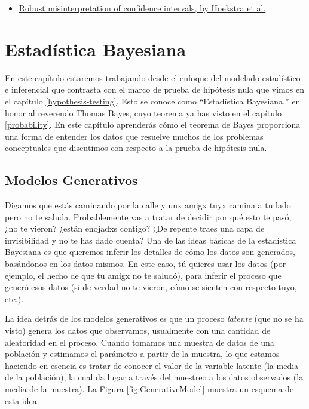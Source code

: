 \documentclass[
  12pt,
]{book}
\providecommand{\tightlist}{%
  \setlength{\itemsep}{0pt}\setlength{\parskip}{0pt}}
\begin{document}
\begin{itemize}
\tightlist
\item
  \href{http://www.ejwagenmakers.com/inpress/HoekstraEtAlPBR.pdf}{Robust misinterpretation of confidence intervals, by Hoekstra et al.}
\end{itemize}

\hypertarget{estaduxedstica-bayesiana}{%
\chapter{Estadística Bayesiana}\label{estaduxedstica-bayesiana}}

En este capítulo estaremos trabajando desde el enfoque del modelado estadístico e inferencial que contrasta con el marco de prueba de hipótesis nula que vimos en el capítulo \ref{hypothesis-testing}.
Esto se conoce como ``Estadística Bayesiana,'' en honor al reverendo Thomas Bayes, cuyo teorema ya has visto en el capítulo \ref{probability}. En este capítulo aprenderás cómo el teorema de Bayes proporciona una forma de entender los datos que resuelve muchos de los problemas conceptuales que discutimos con respecto a la prueba de hipótesis nula.

\hypertarget{modelos-generativos}{%
\section{Modelos Generativos}\label{modelos-generativos}}

Digamos que estás caminando por la calle y unx amigx tuyx camina a tu lado pero no te saluda. Probablemente vas a tratar de decidir por qué esto te pasó, ¿no te vieron? ¿están enojadxs contigo? ¿De repente traes una capa de invisibilidad y no te has dado cuenta? Una de las ideas básicas de la estadística Bayesiana es que queremos inferir los detalles de cómo los datos son generados, basándonos en los datos mismos. En este caso, tú quieres usar los datos (por ejemplo, el hecho de que tu amigx no te saludó), para inferir el proceso que generó esos datos (si de verdad no te vieron, cómo se sienten con respecto tuyo, etc.).

La idea detrás de los modelos generativos es que un proceso \emph{latente} (que no se ha visto) genera los datos que observamos, usualmente con una cantidad de aleatoridad en el proceso. Cuando tomamos una muestra de datos de una población y estimamos el parámetro a partir de la muestra, lo que estamos haciendo en esencia es tratar de conocer el valor de la variable latente (la media de la población), la cual da lugar a través del muestreo a los datos observados (la media de la muestra). La Figura \ref{fig:GenerativeModel} muestra un esquema de esta idea.
\end{document}
